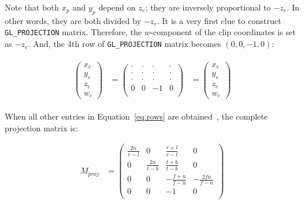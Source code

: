 Note that both $x_p$ and $y_p$ depend on $z_e$; they are inversely proportional to $-z_e$. In other words, they are both divided by $-z_e$. It is a very first clue to construct \verb|GL_PROJECTION| matrix. Therefore, the $w$-component of the clip coordinates is set as $-z_e$. And, the 4th row of \verb|GL_PROJECTION| matrix becomes $(0, 0, -1, 0)$: 

\begin{equation}
\begin{aligned}
\begin{split}
\begin{pmatrix} x_{c}\\y_{c}\\z_{c}\\w_{c} \end{pmatrix} &= 
\begin{pmatrix} 
\cdot & \cdot & \cdot & \cdot \\
\cdot & \cdot & \cdot & \cdot \\
\cdot & \cdot & \cdot & \cdot \\
0 & 0 & -1 & 0 \\
\end{pmatrix} &=
\begin{pmatrix} x_{e}\\y_{e}\\z_{e}\\w_{e} \end{pmatrix}
\end{split}
\end{aligned}
\label{eq.rows}
\end{equation}


When all other entries in Equation~\ref{eq.rows} are obtained~\cite{schreiner2004}, the complete projection matrix is: 

\begin{equation}
\begin{aligned}
M_{proj} &= 
\begin{pmatrix} 
\frac{2n}{r-l} & 0 & \frac{r+l}{r-l} & 0 \\
0 & \frac{2n}{t-b} & \frac{t+b}{t-b} & 0 \\
0 & 0 & -\frac{f+n}{f-n} & -\frac{2fn}{f-n} \\
0 & 0 & -1 & 0 \\
\end{pmatrix} \\
\end{aligned}
\label{eq.projection_matrix}
\end{equation}


